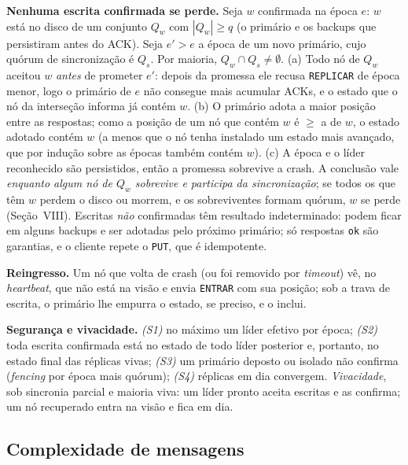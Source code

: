 \documentclass[conference,a4paper]{IEEEtran}
\begin{document}
\textbf{Nenhuma escrita confirmada se perde.} Seja $w$ confirmada na época
$e$: $w$ está no disco de um conjunto $Q_w$ com $|Q_w|\ge q$ (o primário e
os backups que persistiram antes do ACK). Seja $e'>e$ a época de um novo
primário, cujo quórum de sincronização é $Q_s$. Por maioria,
$Q_w\cap Q_s\neq\emptyset$. (a) Todo nó de $Q_w$ aceitou $w$ \emph{antes} de
prometer $e'$: depois da promessa ele recusa \texttt{REPLICAR} de época
menor, logo o primário de $e$ não consegue mais acumular ACKs, e o estado
que o nó da interseção informa já contém $w$. (b) O primário adota a maior
posição entre as respostas; como a posição de um nó que contém $w$ é
$\ge$ a de $w$, o estado adotado contém $w$ (a menos que o nó tenha instalado
um estado mais avançado, que por indução sobre as épocas também contém $w$).
(c) A época e o líder reconhecido são persistidos, então a promessa
sobrevive a crash. A conclusão vale \emph{enquanto algum nó de $Q_w$
sobrevive e participa da sincronização}; se todos os que têm $w$ perdem o
disco ou morrem, e os sobreviventes formam quórum, $w$ se perde (Seção~VIII).
Escritas \emph{não} confirmadas têm resultado indeterminado: podem ficar em
alguns backups e ser adotadas pelo próximo primário; só respostas \texttt{ok}
são garantias, e o cliente repete o \texttt{PUT}, que é idempotente.

\textbf{Reingresso.} Um nó que volta de crash (ou foi removido por
\emph{timeout}) vê, no \emph{heartbeat}, que não está na visão e envia
\texttt{ENTRAR} com sua posição; sob a trava de escrita, o primário lhe
empurra o estado, se preciso, e o inclui.

\textbf{Segurança e vivacidade.} \emph{(S1)} no máximo um líder efetivo por
época; \emph{(S2)} toda escrita confirmada está no estado de todo líder
posterior e, portanto, no estado final das réplicas vivas; \emph{(S3)} um
primário deposto ou isolado não confirma (\emph{fencing} por época mais
quórum); \emph{(S4)} réplicas em dia convergem. \emph{Vivacidade}, sob
sincronia parcial e maioria viva: um líder pronto aceita escritas e as
confirma; um nó recuperado entra na visão e fica em dia.

\subsection{Complexidade de mensagens}
\end{document}
